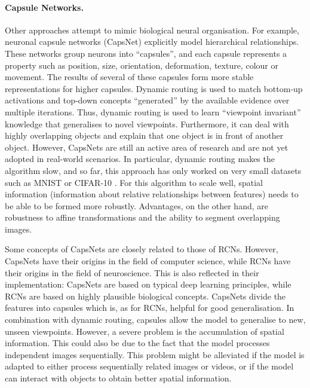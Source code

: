 \paragraph{Capsule Networks.} Other approaches attempt to mimic biological neural organisation. For example, neuronal capsule networks (CapsNet)  explicitly model hierarchical relationships. These networks group neurons into ``capsules'', and each capsule represents a property such as position, size, orientation, deformation, texture, colour or movement. The results of several of these capsules form more stable representations for higher capsules. Dynamic routing is used to match bottom-up activations and top-down concepts ``generated'' by the available evidence over multiple iterations. Thus, dynamic routing is used to learn ``viewpoint invariant'' knowledge that generalises to novel viewpoints. Furthermore, it can deal with highly overlapping objects and explain that one object is in front of another object. However, CapsNets are still an active area of research and are not yet adopted in real-world scenarios. In particular, dynamic routing makes the algorithm slow, and so far, this approach has only worked on very small datasets such as MNIST \cite{Lecun_Bottou_Bengio_Haffner_1998} or CIFAR-10 \cite{cifar_10}. For this algorithm to scale well, spatial information (information about relative relationships between features) needs to be able to be formed more robustly. Advantages, on the other hand, are robustness to affine transformations and the ability to segment overlapping images.

Some concepts of CapsNets are closely related to those of RCNs. However, CapsNets have their origins in the field of computer science, while RCNs have their origins in the field of neuroscience. This is also reflected in their implementation: CapsNets are based on typical deep learning principles, while RCNs are based on highly plausible biological concepts. CapsNets divide the features into capsules which is, as for RCNs, helpful for good generalisation. In combination with dynamic routing, capsules allow the model to generalise to new, unseen viewpoints. However, a severe problem is the accumulation of spatial information. This could also be due to the fact that the model processes independent images sequentially. This problem might be alleviated if the model is adapted to either process sequentially related images or videos, or if the model can interact with objects to obtain better spatial information.

